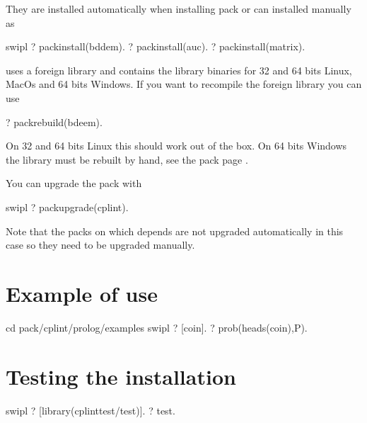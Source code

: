 \documentclass[letterpaper,10pt,english]{sphinxmanual}
\begin{document}
They are installed automatically when installing pack  or can installed manually as

\begin{sphinxVerbatim}[commandchars=\\\{\}]
\PYGZdl{} swipl
?\PYGZhy{} pack\PYGZus{}install(bddem).
?\PYGZhy{} pack\PYGZus{}install(auc).
?\PYGZhy{} pack\PYGZus{}install(matrix).
\end{sphinxVerbatim}

 uses a foreign library and contains the library binaries for 32 and 64 bits Linux, MacOs and 64 bits Windows. If you want to recompile the foreign library you can use

\begin{sphinxVerbatim}[commandchars=\\\{\}]
?\PYGZhy{} pack\PYGZus{}rebuild(bdeem).
\end{sphinxVerbatim}

On 32 and 64 bits Linux this should work out of the box. On 64 bits Windows the library must be rebuilt by hand, see the pack page .

You can upgrade the pack with

\begin{sphinxVerbatim}[commandchars=\\\{\}]
\PYGZdl{} swipl
?\PYGZhy{} pack\PYGZus{}upgrade(cplint).
\end{sphinxVerbatim}

Note that the packs on which  depends are not upgraded automatically in this case so they need to be upgraded manually.


\section{Example of use}
\label{\detokenize{index:example-of-use}}
\begin{sphinxVerbatim}[commandchars=\\\{\}]
\PYGZdl{} cd \PYGZlt{}pack\PYGZgt{}/cplint/prolog/examples
\PYGZdl{} swipl
?\PYGZhy{} [coin].
?\PYGZhy{} prob(heads(coin),P).
\end{sphinxVerbatim}


\section{Testing the installation}
\label{\detokenize{index:testing-the-installation}}
\begin{sphinxVerbatim}[commandchars=\\\{\}]
\PYGZdl{} swipl
?\PYGZhy{} [library(cplint\PYGZus{}test/test)].
?\PYGZhy{} test.
\end{sphinxVerbatim}
\end{document}
